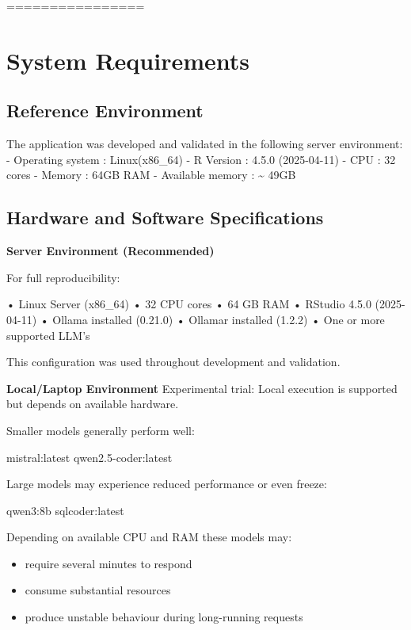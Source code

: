\documentclass[
]{article}
\providecommand{\tightlist}{%
  \setlength{\itemsep}{0pt}\setlength{\parskip}{0pt}}
\begin{document}
================

\section{System Requirements}\label{system-requirements}

\subsection{Reference Environment}\label{reference-environment}

The application was developed and validated in the following server
environment: - Operating system : Linux(x86\_64) - R Version : 4.5.0
(2025-04-11) - CPU : 32 cores - Memory : 64GB RAM - Available memory :
\textasciitilde{} 49GB

\subsection{Hardware and Software
Specifications}\label{hardware-and-software-specifications}

\textbf{Server Environment (Recommended)}

For full reproducibility:

• Linux Server (x86\_64) • 32 CPU cores • 64 GB RAM • RStudio 4.5.0
(2025-04-11) • Ollama installed (0.21.0) • Ollamar installed (1.2.2) •
One or more supported LLM's

This configuration was used throughout development and validation.

\textbf{Local/Laptop Environment} Experimental trial: Local execution is
supported but depends on available hardware.

Smaller models generally perform well:

mistral:latest qwen2.5-coder:latest

Large models may experience reduced performance or even freeze:

qwen3:8b sqlcoder:latest

Depending on available CPU and RAM these models may:

\begin{itemize}
\tightlist
\item
  require several minutes to respond
\item
  consume substantial resources
\item
  produce unstable behaviour during long-running requests
\end{itemize}
\end{document}
